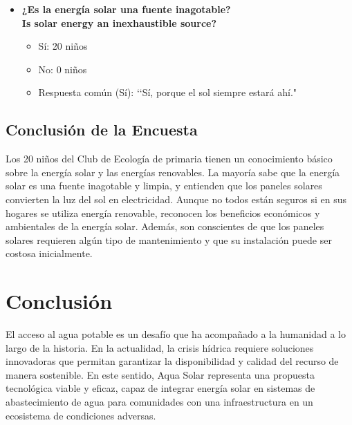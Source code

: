 \documentclass[12pt]{article}
\begin{document}
\begin{itemize}
      \item \textbf{¿Es la energía solar una fuente inagotable?}\\
            \textbf{Is solar energy an inexhaustible source?}
            \begin{itemize}
                  \item Sí: 20 niños
                  \item No: 0 niños
                  \item Respuesta común (Sí): \lq\lq Sí, porque el sol siempre estará ahí."
            \end{itemize}
            \begin{minipage}{\linewidth}
                  \centering
                  \begin{minipage}{0.5\linewidth}
                  \end{minipage}%
            \end{minipage}
\end{itemize}

\subsection{Conclusión de la Encuesta}
Los 20 niños del Club de Ecología de primaria tienen un conocimiento básico sobre la energía solar y las energías renovables. La mayoría sabe que la energía solar es una fuente inagotable y limpia, y entienden que los paneles solares convierten la luz del sol en electricidad. Aunque no todos están seguros si en sus hogares se utiliza energía renovable, reconocen los beneficios económicos y ambientales de la energía solar. Además, son conscientes de que los paneles solares requieren algún tipo de mantenimiento y que su instalación puede ser costosa inicialmente.




\newpage
\section{Conclusión}
El acceso al agua potable es un desafío que ha acompañado a la humanidad a lo largo de la historia. En la actualidad, la crisis hídrica requiere soluciones innovadoras que permitan garantizar la disponibilidad y calidad del recurso de manera sostenible. En este sentido, Aqua Solar representa una propuesta tecnológica viable y eficaz, capaz de integrar energía solar en sistemas de abastecimiento de agua para comunidades con una infraestructura en un ecosistema de condiciones adversas.
\end{document}
